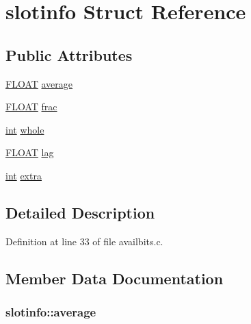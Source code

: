 \hypertarget{structslotinfo}{}\section{slotinfo Struct Reference}
\label{structslotinfo}
\subsection*{Public Attributes}
\begin{DoxyCompactItemize}
\item 
\hyperlink{twolame_2libtwolame_2common_8h_ae8690abbffa85934d64d545920e2b108}{F\+L\+O\+AT} \hyperlink{structslotinfo_af2f90234509d20d72f0640cd7011ee17}{average}
\item 
\hyperlink{twolame_2libtwolame_2common_8h_ae8690abbffa85934d64d545920e2b108}{F\+L\+O\+AT} \hyperlink{structslotinfo_a1c794ac75eaea4262b6173cfbc23d9ac}{frac}
\item 
\hyperlink{xmltok_8h_a5a0d4a5641ce434f1d23533f2b2e6653}{int} \hyperlink{structslotinfo_a14c0d93d7d67c9a13b12df28061462cb}{whole}
\item 
\hyperlink{twolame_2libtwolame_2common_8h_ae8690abbffa85934d64d545920e2b108}{F\+L\+O\+AT} \hyperlink{structslotinfo_a6aaf9bb99b2ae52c8b5f70cb266b2b9b}{lag}
\item 
\hyperlink{xmltok_8h_a5a0d4a5641ce434f1d23533f2b2e6653}{int} \hyperlink{structslotinfo_acefe5063703e5da84378661b8caefd61}{extra}
\end{DoxyCompactItemize}


\subsection{Detailed Description}


Definition at line 33 of file availbits.\+c.



\subsection{Member Data Documentation}
\subsubsection[{\texorpdfstring{average}{average}}]{ slotinfo\+::average}\hypertarget{structslotinfo_af2f90234509d20d72f0640cd7011ee17}{}\label{structslotinfo_af2f90234509d20d72f0640cd7011ee17}


